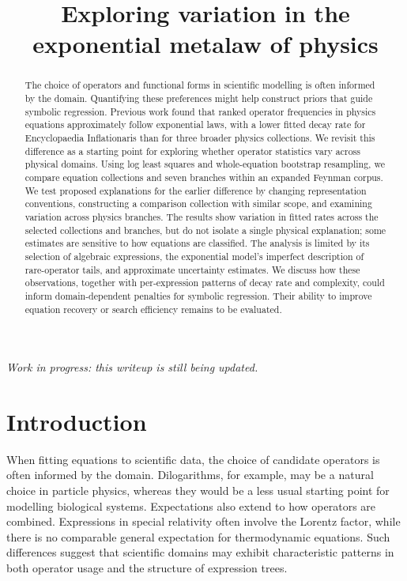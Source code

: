 \documentclass[10pt]{article}
\title{Exploring variation in the exponential metalaw of physics}
\author{}
\date{}
\begin{document}
\maketitle

\begin{center}
\small\itshape Work in progress: this writeup is still being updated.
\end{center}

\begin{abstract}
The choice of operators and functional forms in scientific modelling is often informed by the domain. Quantifying these preferences might help construct priors that guide symbolic regression. Previous work found that ranked operator frequencies in physics equations approximately follow exponential laws, with a lower fitted decay rate for Encyclopaedia Inflationaris than for three broader physics collections. We revisit this difference as a starting point for exploring whether operator statistics vary across physical domains. Using log least squares and whole-equation bootstrap resampling, we compare equation collections and seven branches within an expanded Feynman corpus. We test proposed explanations for the earlier difference by changing representation conventions, constructing a comparison collection with similar scope, and examining variation across physics branches. The results show variation in fitted rates across the selected collections and branches, but do not isolate a single physical explanation; some estimates are sensitive to how equations are classified. The analysis is limited by its selection of algebraic expressions, the exponential model's imperfect description of rare-operator tails, and approximate uncertainty estimates. We discuss how these observations, together with per-expression patterns of decay rate and complexity, could inform domain-dependent penalties for symbolic regression. Their ability to improve equation recovery or search efficiency remains to be evaluated.
\end{abstract}

\section{Introduction}
When fitting equations to scientific data, the choice of candidate operators is often informed by the domain. Dilogarithms, for example, may be a natural choice in particle physics, whereas they would be a less usual starting point for modelling biological systems. Expectations also extend to how operators are combined. Expressions in special relativity often involve the Lorentz factor, while there is no comparable general expectation for thermodynamic equations. Such differences suggest that scientific domains may exhibit characteristic patterns in both operator usage and the structure of expression trees.
\end{document}
